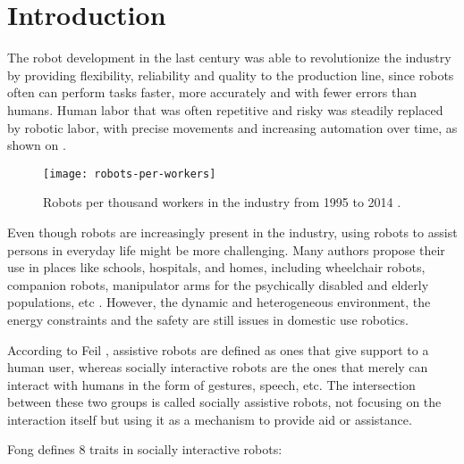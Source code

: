 \chapter{Introduction}\label{chp:intro}

The robot development in the last century was able to revolutionize the industry by providing flexibility, reliability and quality to the production line, since robots often can perform tasks faster, more accurately and with fewer errors than humans. Human labor that was often repetitive and risky was steadily replaced by robotic labor, with precise movements and increasing automation over time, as shown on .

\begin{figure}[!ht]
    \centering
    \texttt{[image: robots-per-workers]}
    \caption[Robots per thousand workers in the industry from 1995 to 2014.]{Robots per thousand workers in the industry from 1995 to 2014 \cite{dauth2017german}.}
    \label{fig:robots-per-workers}
\end{figure}

Even though robots are increasingly present in the industry, using robots to assist persons in everyday life might be more challenging. Many authors propose their use in places like schools, hospitals, and homes, including wheelchair robots, companion robots, manipulator arms for the psychically disabled and elderly populations, etc \cite{feil2005defining}. However, the dynamic and heterogeneous environment, the energy constraints and the safety are still issues in domestic use robotics.

According to Feil \cite{feil2005defining}, assistive robots are defined as ones that give support to a human user, whereas socially interactive robots are the ones that merely can interact with humans in the form of gestures, speech, etc. The intersection between these two groups is called socially assistive robots, not focusing on the interaction itself but using it as a mechanism to provide aid or assistance.

Fong \cite{fong2003survey} defines 8 traits in socially interactive robots:

